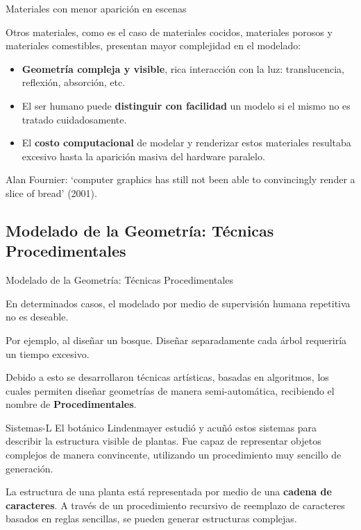 \documentclass[spanish]{beamer}
\begin{document}
\begin{frame}{Materiales con menor aparición en escenas}

Otros materiales, como es el caso de materiales cocidos, materiales porosos y materiales comestibles, presentan mayor complejidad en el modelado:

\begin{itemize}
\item \textbf{Geometría compleja y visible}, rica interacción con la luz: translucencia, reflexión, absorción, etc.
\item El ser humano puede \textbf{distinguir con facilidad} un modelo si el mismo no es tratado cuidadosamente.
\item El \textbf{costo computacional} de modelar y renderizar estos materiales resultaba excesivo hasta la aparición masiva del hardware paralelo.
\end{itemize}

Alan Fournier: `computer graphics has still not been
able to convincingly render a slice of bread' (2001). 


\end{frame}

\subsection{Modelado de la Geometría: Técnicas Procedimentales}
\begin{frame}{Modelado de la Geometría: Técnicas Procedimentales}

En determinados casos, el modelado por medio de supervisión humana repetitiva no es deseable.

\vspace{0.5cm}
Por ejemplo, al diseñar un bosque. Diseñar separadamente cada árbol requeriría un tiempo excesivo.

\vspace{0.5cm}
Debido a esto se desarrollaron técnicas artísticas, basadas en algoritmos, los cuales permiten diseñar geometrías de manera semi-automática, recibiendo el nombre de \textbf{Procedimentales}.

\end{frame}

\begin{frame}{Sistemas-L}
El botánico Lindenmayer estudió y acuñó estos sistemas para describir la estructura visible de plantas. Fue capaz de representar objetos complejos de manera convincente, utilizando un procedimiento muy sencillo de generación.

La estructura de una planta está representada por medio de una \textbf{cadena de caracteres}.
A través de un procedimiento recursivo de reemplazo de caracteres basados en reglas sencillas, se pueden generar estructuras complejas.

\end{frame}
\end{document}
